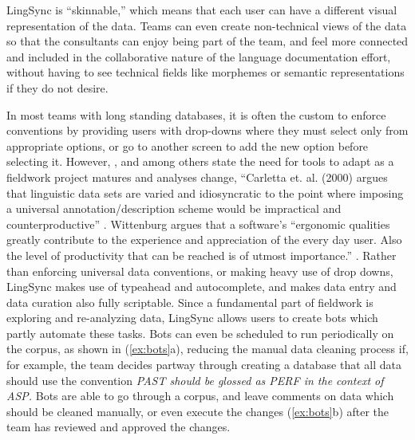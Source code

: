 \documentclass[letterpaper, 12pt, dvips]{mitwpl}
\begin{document}
LingSync is ``skinnable,''
which means that each user can have a different visual representation of the data.
Teams can even create non-technical views of the data so that the consultants can enjoy being part of the team, and feel more connected and included in  the collaborative nature of the language documentation effort, without having to see technical fields like morphemes or semantic representations if they do not desire.


In most teams with long standing databases,
it is often the custom to enforce conventions by providing users with drop-downs where they must select only from appropriate options,
or go to another screen to add the new option before selecting it.
However, \cite{Palmer:2009}, \cite{Cihlar:2008}  and \cite{Wittenburg:2006} among others state the need for tools to adapt as a fieldwork project matures and analyses change, 
``Carletta et. al. (2000) argues that linguistic data sets are varied and idiosyncratic to the point where imposing a universal annotation/description scheme would be impractical and counterproductive''   \cite[p.11]{Cihlar:2008}. Wittenburg argues that a software's ``ergonomic qualities greatly contribute to the experience and appreciation of the every day user. Also the level of productivity that can be reached is of utmost importance.'' \citep[p.1559]{Wittenburg:2006}.
Rather than enforcing universal data conventions,
or making heavy use of drop downs, 
LingSync makes use of  typeahead and autocomplete, 
and makes data entry and data curation also fully scriptable.
Since a fundamental part of fieldwork is exploring and re-analyzing data,
LingSync allows users to create bots which partly automate these tasks.
Bots can even be scheduled to run periodically on the corpus, as shown in (\ref{ex:bots}a),
reducing the manual data cleaning process if,
for example,
the team decides partway through creating a database that all data should use the convention \emph{PAST should be glossed as PERF in the context of ASP.} Bots are able to go through a corpus,
and leave comments on data which should be cleaned manually,
or even execute the changes (\ref{ex:bots}b) after the team has reviewed and approved the changes.


\end{document}
